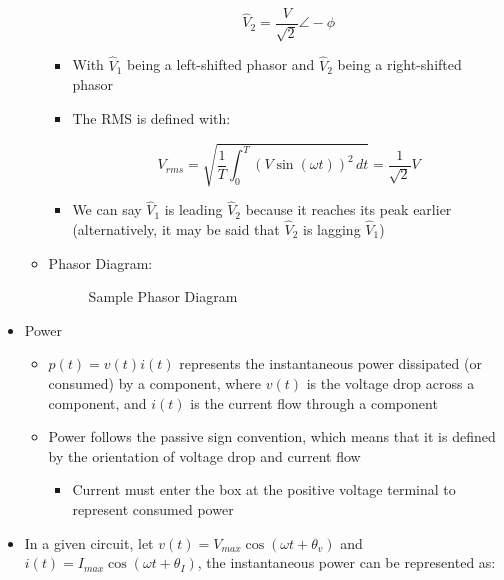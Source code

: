 \begin{itemize}
\begin{itemize}
\begin{itemize}
            $$\hat{V}_2=\frac{V}{\sqrt{2}}\angle-\phi$$

          \item With $\hat{V}_1$ being a left-shifted phasor and $\hat{V}_2$ being a right-shifted phasor

          \item The RMS is defined with:

            $$V_{rms}=\sqrt{\frac{1}{T}\int_0^T(V\sin(\omega t))^2\,dt}=\frac{1}{\sqrt{2}}V$$

          \item We can say $\hat{V}_1$ is leading $\hat{V}_2$ because it reaches its peak earlier (alternatively, it may be said that $\hat{V}_2$ is lagging $\hat{V}_1$)

        \end{itemize}

      \item Phasor Diagram:

        \begin{figure}[H]
          \centering
          
          \caption{Sample Phasor Diagram}
          \label{fig:1}
        \end{figure}

    \end{itemize}

  \item Power

    \begin{itemize}

      \item $p(t)=v(t)i(t)$ represents the instantaneous power dissipated (or consumed) by a component, where $v(t)$ is the voltage drop across a component, and $i(t)$ is the current flow through a component

      \item Power follows the passive sign convention, which means that it is defined by the orientation of voltage drop and current flow

        \begin{itemize}

            \item Current must enter the box at the positive voltage terminal to represent consumed power

        \end{itemize}

    \end{itemize}

  \item In a given circuit, let $v(t)=V_{max}\cos(\omega t+\theta_v)$ and $i(t)=I_{max}\cos(\omega t+\theta_I)$, the instantaneous power can be represented as:


\end{itemize}

